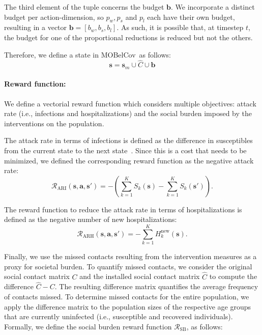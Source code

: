 \documentclass{article}
\renewcommand{\cite}[1]{\citep{#1}}
\newcommand{\mdprewardfn}{\mathcal{R}}
\newcommand{\mdpstate}{\mathbf{s}}
\newcommand{\mdpaction}{\mathbf{a}}
\newcommand{\momdpname}{MOBelCov}
\newcommand{\agegroups}{K}
\newcommand{\budget}{\bm{b}}
\begin{document}
The third element of the tuple concerns the budget $\budget$. We incorporate a distinct budget per action-dimension, so $p_{w}, p_{s}$ and $p_{l}$ each have their own budget, resulting in a vector $\budget = [b_w, b_s, b_l]$. As such, it is possible that, at timestep $t$, the budget for one of the proportional reductions is reduced but not the others.

Therefore, we define a state in \momdpname\ as follows:
\begin{equation}
    \mdpstate = \mdpstate_m \cup \hat{C} \cup \budget
\end{equation}

\paragraph{Reward function:} We define a vectorial reward function which considers multiple objectives: attack rate (i.e., infections and hospitalizations) and the social burden imposed by the interventions on the population.

The attack rate in terms of infections is defined as the difference in susceptibles from the current state to the next state~\cite{libin2020}. Since this is a cost that needs to be minimized, we defined the corresponding reward function as the negative attack rate:
\begin{equation}
\mdprewardfn_{\text{ARI}}(\mdpstate,\mdpaction,\mdpstate') = -(\sum_{k=1}^{\agegroups}S_k(\mdpstate)-\sum_{k=1}^{\agegroups}S_k(\mdpstate')).
\end{equation}

The reward function to reduce the attack rate in terms of hospitalizations is defined as the negative number of new hospitalizations:
\begin{equation}
\mdprewardfn_{\text{ARH}}(\mdpstate,\mdpaction,\mdpstate') = -\sum_{k=1}^{\agegroups}H^\text{new}_k(\mdpstate).
\label{eqn:attack-rate-hosp}
\end{equation}

Finally, we use the missed contacts resulting from the intervention measures as a proxy for societal burden. To quantify missed contacts, we consider the original social contact matrix $C$ and the installed social contact matrix $\hat{C}$ to compute the difference $\hat{C} - C$. 
The resulting difference matrix quantifies the average frequency of contacts missed. To determine missed contacts for the entire population, we apply the difference matrix to the population sizes of the respective age groups that are currently uninfected (i.e., susceptible and recovered individuals). Formally, we define the social burden reward function $\mdprewardfn_{\text{SB}}$, as follows:
\end{document}
